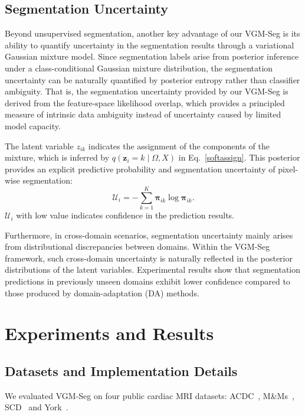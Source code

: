 \documentclass[preprint,12pt]{elsarticle}
\begin{document}
\subsection{Segmentation Uncertainty}

Beyond unsupervised segmentation, another key advantage of our VGM-Seg is its ability to quantify uncertainty in the segmentation results through a variational Gaussian mixture model.
Since segmentation labels arise from posterior inference under a class-conditional Gaussian mixture distribution, the segmentation uncertainty can be naturally quantified by posterior entropy rather than classifier ambiguity.  
That is, the segmentation uncertainty provided by our VGM-Seg is derived from the feature-space likelihood overlap, which provides a principled measure of intrinsic data ambiguity instead of uncertainty caused by limited model capacity.



The latent variable
$z_{ik}$ indicates the assignment of the components of the mixture, which is inferred by $q(\mathbf{z}_i = k \mid \Omega, X)$ in Eq.~\eqref{softassign}.
%
This posterior provides an explicit predictive probability and segmentation uncertainty of pixel-wise segmentation:
\begin{equation}
\mathcal{U}_{i}=- \sum_{k=1}^K \boldsymbol{\pi}_{ik} \log \boldsymbol{\pi}_{ik}.
\end{equation}
$\mathcal{U}_{i}$ with low value indicates confidence in the prediction results.



Furthermore, in cross-domain scenarios, segmentation uncertainty mainly arises from distributional discrepancies between domains. Within the VGM-Seg framework, such cross-domain uncertainty is naturally reflected in the posterior distributions of the latent variables. Experimental results show that segmentation predictions in previously unseen domains exhibit lower confidence compared to those produced by domain-adaptation (DA) methods.


%



\section{Experiments and Results}
\subsection{Datasets and Implementation Details}
We evaluated VGM-Seg on four public cardiac MRI datasets: ACDC~\cite{Bernard2018Deep}, M\&Ms~\cite{Campello2021Multi}, SCD~\cite{radau2009evaluation} and York~\cite{andreopoulos2008efficient}.
\end{document}

